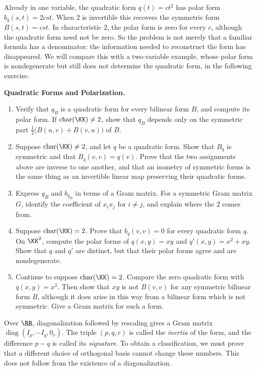 \documentclass[12pt,reqno]{amsart}
\DeclareMathOperator{\diag}{diag}
\begin{document}
Already in one variable, the quadratic form $q(t)=ct^2$ has polar form $b_q(s,t)=2cst$. When $2$ is invertible this recovers the symmetric form $B(s,t)=cst$. In characteristic $2$, the polar form is zero for every $c$, although the quadratic form need not be zero. So the problem is not merely that a familiar formula has a denominator: the information needed to reconstruct the form has disappeared. We will compare this with a two-variable example, whose polar form is nondegenerate but still does not determine the quadratic form, in the following exercise.

\hrulefill

\begin{problems}
\item\label{b:quadratic} \textbf{Quadratic Forms and Polarization.}
\begin{enumerate}
\item Verify that $q_B$ is a quadratic form for every bilinear form $B$, and compute its polar form. If $\operatorname{char}(\KK)\ne2$, show that $q_B$ depends only on the symmetric part $\tfrac12\big(B(u,v)+B(v,u)\big)$ of $B$.
\item Suppose $\operatorname{char}(\KK)\ne2$, and let $q$ be a quadratic form. Show that $B_q$ is symmetric and that $B_q(v,v)=q(v)$. Prove that the two assignments above are inverse to one another, and that an isometry of symmetric forms is the same thing as an invertible linear map preserving their quadratic forms.
\item Express $q_B$ and $b_{q_B}$ in terms of a Gram matrix. For a symmetric Gram matrix $G$, identify the coefficient of $x_ix_j$ for $i\ne j$, and explain where the $2$ comes from.
\item Suppose $\operatorname{char}(\KK)=2$. Prove that $b_q(v,v)=0$ for every quadratic form $q$. On $\KK^2$, compute the polar forms of $q(x,y)=xy$ and $q'(x,y)=x^2+xy$. Show that $q$ and $q'$ are distinct, but that their polar forms agree and are nondegenerate.
\item Continue to suppose $\operatorname{char}(\KK)=2$. Compare the zero quadratic form with $q(x,y)=x^2$. Then show that $xy$ is not $B(v,v)$ for any symmetric bilinear form $B$, although it does arise in this way from a bilinear form which is not symmetric. Give a Gram matrix for such a form.
\end{enumerate}
\end{problems}

\hrulefill

Over $\RR$, diagonalization followed by rescaling gives a Gram matrix $\diag(I_p,-I_q,0_r)$. The triple $(p,q,r)$ is called the \emph{inertia} of the form, and the difference $p-q$ is called its \emph{signature}. To obtain a classification, we must prove that a different choice of orthogonal basis cannot change these numbers. This does not follow from the existence of a diagonalization.
\end{document}

